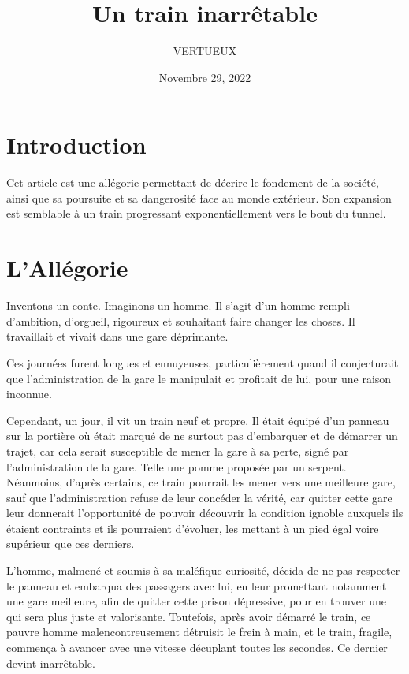\documentclass[]{cls/tools}
\begin{document}
\title{Un train inarrêtable}

\author{VERTUEUX}
\date{Novembre 29, 2022}

\maketitle

\section*{Introduction}

Cet article est une allégorie permettant de décrire le fondement de la société, ainsi que sa poursuite et sa 
dangerosité face au monde extérieur. Son expansion est semblable à un train progressant exponentiellement vers le bout du tunnel.

\section*{L'Allégorie}

Inventons un conte. Imaginons un homme. Il s'agit d'un homme rempli d'ambition, d'orgueil, rigoureux et 
souhaitant faire changer les choses. Il travaillait et vivait dans une gare déprimante. 

Ces journées furent longues et ennuyeuses, particulièrement quand il conjecturait que l'administration de la gare le 
manipulait et profitait de lui, pour une raison inconnue.

Cependant, un jour, il vit un train neuf et propre. Il était équipé d'un panneau sur la portière où était marqué de ne surtout pas 
d'embarquer et de démarrer un trajet, car cela serait susceptible de mener la gare à sa perte, signé par l'administration de la gare. Telle une pomme 
proposée par un serpent. Néanmoins, d'après certains, ce train pourrait les mener vers une meilleure gare, sauf que 
l'administration refuse de leur concéder la vérité, car quitter cette gare leur donnerait l'opportunité de pouvoir découvrir 
la condition ignoble auxquels ils étaient contraints et ils pourraient d'évoluer, les mettant à un pied égal voire supérieur que ces derniers.   

L'homme, malmené et soumis à sa maléfique curiosité, décida de ne pas respecter le panneau 
et embarqua des passagers avec lui, en leur promettant notamment une gare meilleure, afin de quitter 
cette prison dépressive, pour en trouver une qui sera plus juste et valorisante. Toutefois, après 
avoir démarré le train, ce pauvre homme malencontreusement détruisit le frein à main, et le train, fragile, 
commença à avancer avec une vitesse décuplant toutes les secondes. Ce dernier devint inarrêtable. 
\end{document}

